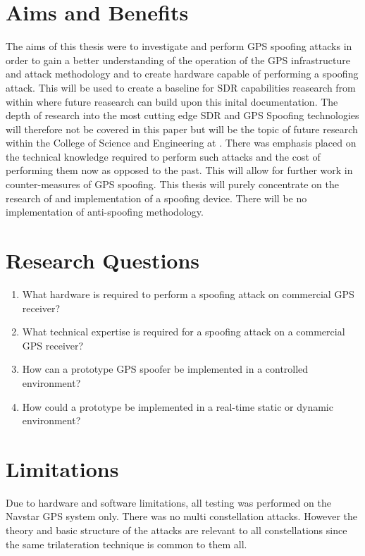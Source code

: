 \section{Aims and Benefits}\label{sec:Aims}
The aims of this thesis were to investigate and perform GPS spoofing attacks in order to gain a better understanding of the operation of the GPS infrastructure and attack
methodology and to create hardware capable of performing a spoofing attack. This will be used to create a baseline for SDR capabilities reasearch from within \univname where future reasearch can build upon this inital documentation.
The depth of research into the most cutting edge SDR and GPS Spoofing technologies will therefore not be covered in this paper but will be the topic of future research
within the College of Science and Engineering at \univname.
There was  emphasis placed on the technical knowledge required to perform such attacks and the cost of performing them now as opposed to the past. This will
allow for further work in counter-measures of GPS spoofing.
This thesis will purely concentrate on the research of and implementation of a spoofing device. There will be no implementation of anti-spoofing methodology.

\section{Research Questions}\label{sec:RQs}
\begin{enumerate}
    \item What hardware is required to perform a spoofing attack on commercial GPS receiver?
    \item What technical expertise is required for a spoofing attack on a commercial GPS receiver?
    \item How can a prototype GPS spoofer be implemented in a controlled environment?
    \item How could a prototype be implemented in a real-time static or dynamic environment? 
\end{enumerate}

\section{Limitations}\label{sec:Limits}
Due to hardware and software limitations, all testing was performed on the Navstar GPS system only. There was no multi constellation attacks. However the theory and basic
structure of the attacks are relevant to all constellations since the same trilateration technique is common to them all.

